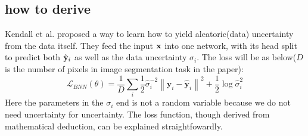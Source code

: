 \documentclass{ctexart}
\begin{document}
\subsection{how to derive}
Kendall et al. proposed a way to learn how to yield aleatoric(data) uncertainty from the data itself. They feed the input $\bf{x}$ into one network, with its head split to predict both $\hat{\bf{y}}_i$ as well as the data uncertainty $\sigma_i$. The loss will be as below($D$ is the number of pixels in image segmentation task in the paper):
$$
    \mathcal{L}_{BNN}(\theta)=\frac{1}{D} \sum_{i} \frac{1}{2} \hat{\sigma}_{i}^{-2}\left\|\mathbf{y}_{i}-\hat{\mathbf{y}}_{i}\right\|^{2}+\frac{1}{2} \log \hat{\sigma}_{i}^{2}
$$
Here the parameters in the $\sigma_i$ end is not a random variable because we do not need uncertainty for uncertainty. The loss function, though derived from mathematical deduction, can be explained straightfowardly.
\nocite{*}


\end{document}
